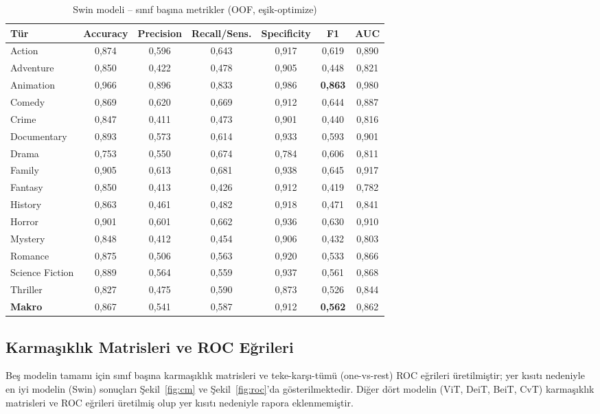 \documentclass[conference]{IEEEtran}
\begin{document}
\begin{table}[htbp]
\caption{Swin modeli -- sınıf başına metrikler (OOF, eşik-optimize)}
\begin{center}
\begin{tabular}{lcccccc}
\toprule
\textbf{Tür} & \textbf{Accuracy} & \textbf{Precision} & \textbf{Recall/Sens.} & \textbf{Specificity} & \textbf{F1} & \textbf{AUC}\\
\midrule
Action          & 0,874 & 0,596 & 0,643 & 0,917 & 0,619 & 0,890\\
Adventure       & 0,850 & 0,422 & 0,478 & 0,905 & 0,448 & 0,821\\
Animation       & 0,966 & 0,896 & 0,833 & 0,986 & \textbf{0,863} & 0,980\\
Comedy          & 0,869 & 0,620 & 0,669 & 0,912 & 0,644 & 0,887\\
Crime           & 0,847 & 0,411 & 0,473 & 0,901 & 0,440 & 0,816\\
Documentary     & 0,893 & 0,573 & 0,614 & 0,933 & 0,593 & 0,901\\
Drama           & 0,753 & 0,550 & 0,674 & 0,784 & 0,606 & 0,811\\
Family          & 0,905 & 0,613 & 0,681 & 0,938 & 0,645 & 0,917\\
Fantasy         & 0,850 & 0,413 & 0,426 & 0,912 & 0,419 & 0,782\\
History         & 0,863 & 0,461 & 0,482 & 0,918 & 0,471 & 0,841\\
Horror          & 0,901 & 0,601 & 0,662 & 0,936 & 0,630 & 0,910\\
Mystery         & 0,848 & 0,412 & 0,454 & 0,906 & 0,432 & 0,803\\
Romance         & 0,875 & 0,506 & 0,563 & 0,920 & 0,533 & 0,866\\
Science Fiction & 0,889 & 0,564 & 0,559 & 0,937 & 0,561 & 0,868\\
Thriller        & 0,827 & 0,475 & 0,590 & 0,873 & 0,526 & 0,844\\
\midrule
\textbf{Makro}  & 0,867 & 0,541 & 0,587 & 0,912 & \textbf{0,562} & 0,862\\
\bottomrule
\end{tabular}
\label{tab:perclass}
\end{center}
\end{table}

\subsection{Karmaşıklık Matrisleri ve ROC Eğrileri}
Beş modelin tamamı için sınıf başına karmaşıklık matrisleri ve teke-karşı-tümü
(one-vs-rest) ROC eğrileri üretilmiştir; yer kısıtı nedeniyle en iyi modelin
(Swin) sonuçları Şekil~\ref{fig:cm} ve Şekil~\ref{fig:roc}'da gösterilmektedir.
Diğer dört modelin (ViT, DeiT, BeiT, CvT) karmaşıklık matrisleri ve ROC eğrileri
üretilmiş olup yer kısıtı nedeniyle rapora eklenmemiştir.
\end{document}
